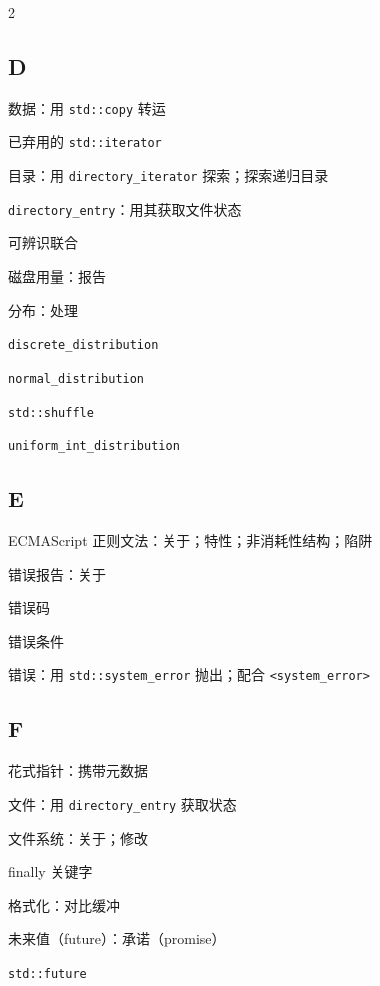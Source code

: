 \begin{multicols}{2}
\subsection*{D}

\noindent 数据：用 \texttt{std::\allowbreak{}copy} 转运\par
\noindent 已弃用的 \texttt{std::\allowbreak{}iterator}\par
\noindent 目录：用 \texttt{directory\_\allowbreak{}iterator} 探索；探索递归目录\par
\noindent \texttt{directory\_\allowbreak{}entry}：用其获取文件状态\par
\noindent 可辨识联合\par
\noindent 磁盘用量：报告\par
\noindent 分布：处理\par
\noindent \texttt{discrete\_\allowbreak{}distribution}\par
\noindent \texttt{normal\_\allowbreak{}distribution}\par
\noindent \texttt{std::\allowbreak{}shuffle}\par
\noindent \texttt{uniform\_\allowbreak{}int\_\allowbreak{}distribution}\par

\subsection*{E}

\noindent ECMAScript 正则文法：关于；特性；非消耗性结构；陷阱\par
\noindent 错误报告：关于\par
\noindent 错误码\par
\noindent 错误条件\par
\noindent 错误：用 \texttt{std::\allowbreak{}system\_\allowbreak{}error} 抛出；配合 \texttt{<system\_\allowbreak{}error>\allowbreak{}}\par

\subsection*{F}

\noindent 花式指针：携带元数据\par
\noindent 文件：用 \texttt{directory\_\allowbreak{}entry} 获取状态\par
\noindent 文件系统：关于；修改\par
\noindent finally 关键字\par
\noindent 格式化：对比缓冲\par
\noindent 未来值（future）：承诺（promise）\par
\noindent \texttt{std::\allowbreak{}future}\par


\end{multicols}
